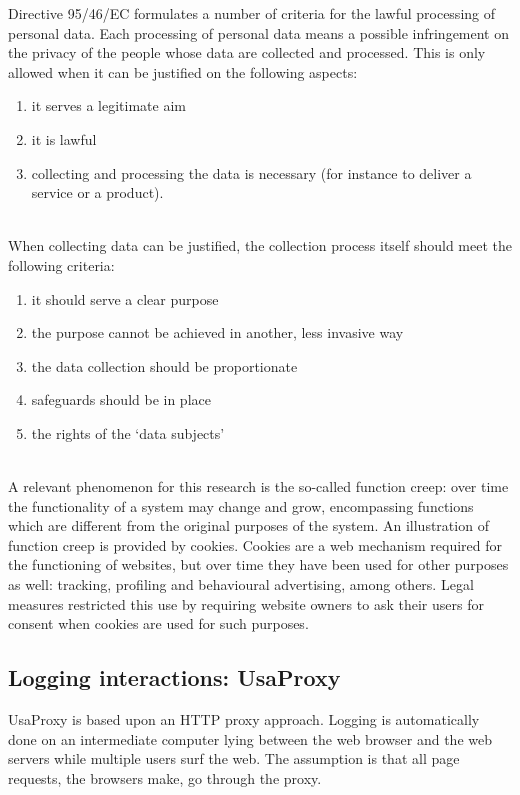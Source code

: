Directive 95/46/EC formulates a number of criteria for the lawful processing of personal data. Each processing of personal data means a possible infringement on the privacy of the people whose data are collected and processed. This is only allowed when it can be justified on the following aspects:
\begin{enumerate}
	\item it serves a legitimate aim
	\item it is lawful
	\item collecting and processing the data is necessary (for instance to deliver a service or a product).
\end{enumerate}
~\\
When collecting data can be justified, the collection process itself should meet the following criteria:
\begin{enumerate}
	\item it should serve a clear purpose
	\item the purpose cannot be achieved in another, less invasive way 
	\item the data collection should be proportionate
	\item safeguards should be in place 
	\item the rights of the ‘data subjects’
\end{enumerate}
~\\
A relevant phenomenon for this research is the so-called function creep: over time the functionality of a system may change and grow, encompassing functions which are different from the original purposes of the system. An illustration of function creep is provided by cookies. Cookies are a web mechanism required for the functioning of websites, but over time they have been used for other purposes as well: tracking, profiling and behavioural advertising, among others. Legal measures restricted this use by requiring website owners to ask their users for consent when cookies are used for such purposes.

\subsection{Logging interactions: UsaProxy}
UsaProxy \cite{wnuk2005usability}\cite{atterer2006logging}\cite{atterer2007tracking} is based upon an HTTP proxy approach. Logging is automatically done on an intermediate computer lying between the web browser and the web servers while multiple users surf the web. The assumption is that all page requests, the browsers make, go through the proxy.
	
